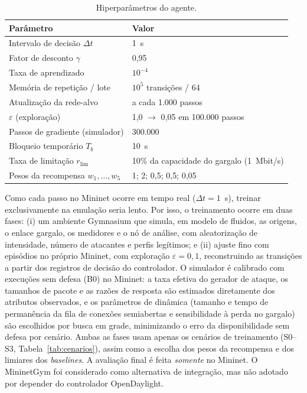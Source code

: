 \documentclass[12pt]{article}
\begin{document}
\begin{table}[ht]
\centering
\caption{Hiperparâmetros do agente.}
\label{tab:hiper}
\footnotesize
\begin{tabular}{@{}ll@{}}
\toprule
\textbf{Parâmetro} & \textbf{Valor} \\
\midrule
Intervalo de decisão $\Delta t$ & 1~s \\
Fator de desconto $\gamma$ & 0{,}95 \\
Taxa de aprendizado & $10^{-4}$ \\
Memória de repetição / lote & $10^{5}$ transições / 64 \\
Atualização da rede-alvo & a cada 1.000 passos \\
$\varepsilon$ (exploração) & 1{,}0 $\rightarrow$ 0{,}05 em 100.000 passos \\
Passos de gradiente (simulador) & 300.000 \\
Bloqueio temporário $T_b$ & 10~s \\
Taxa de limitação $r_{\mathrm{lim}}$ & 10\% da capacidade do gargalo (1~Mbit/s) \\
Pesos da recompensa $w_1,\dots,w_5$ & 1; 2; 0{,}5; 0{,}5; 0{,}05 \\
\bottomrule
\end{tabular}
\end{table}

Como cada passo no Mininet ocorre em tempo real ($\Delta t = 1$~s), treinar
exclusivamente na emulação seria lento. Por isso, o treinamento ocorre em duas
fases: (i) um ambiente Gymnasium \cite{towers2025gymnasium} que simula, em
modelo de fluidos, as origens, o enlace gargalo, os medidores e o nó de
análise, com aleatorização de intensidade, número de atacantes e perfis
legítimos; e (ii) ajuste fino com episódios no próprio Mininet, com
exploração $\varepsilon=0{,}1$, reconstruindo as transições a partir dos
registros de decisão do controlador. O simulador é calibrado com execuções sem
defesa (B0) no Mininet: a taxa efetiva do gerador de ataque, os tamanhos de
pacote e as razões de resposta são estimados diretamente dos atributos
observados, e os parâmetros de dinâmica (tamanho e tempo de permanência da fila
de conexões semiabertas e sensibilidade à perda no gargalo) são escolhidos por
busca em grade, minimizando o erro da disponibilidade sem defesa por cenário. Ambas as fases usam apenas os cenários de treinamento
(S0--S3, Tabela~\ref{tab:cenarios}), assim como a escolha dos pesos da
recompensa e dos limiares dos \textit{baselines}. A avaliação final é feita
\emph{somente} no Mininet. O MininetGym \cite{finistrella2025mininetgym} foi
considerado como alternativa de integração, mas não adotado por depender do
controlador OpenDaylight.
\end{document}
